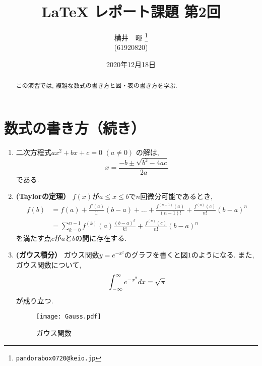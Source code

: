 \documentclass[a4paper,12pt]{jarticle}
\begin{document}
\title{LaTeX レポート課題 第2回}
\author{横井　暉 \thanks{\texttt{pandorabox0720@keio.jp}}\\
(61920820)}
\date{2020年12月18日}
%
\maketitle

\begin{abstract}

この演習では, 複雑な数式の書き方と図・表の書き方を学ぶ.

\end{abstract}

\section{数式の書き方（続き）}

\begin{enumerate}

\item 二次方程式$ax^2 + bx + c = 0$ $(a \neq 0)$ の解は,
\[ x = \frac{ -b \pm \sqrt{b^2 - 4ac}}{2a} \]
である.

\item \textbf{(Taylorの定理）}
$f (x)$が$a \leq x \leq b$で$n$回微分可能であるとき,\\
\begin{align*}
f(b) &=  f(a) + \frac{f'(a)}{1!}(b - a) + \ldots + \frac{f^{(n-1)}(a)}{(n-1)!} + \frac{f^{(n)}(c)}{n!}(b-a)^n\\
     &= \sum_{k = 0}^{n - 1} f^{(k)}(a) \frac{(b-a)^k}{k!} + \frac{f^{(n)}(c)}{n!} (b-a)^n
\end{align*} 
を満たす点$c$が$a$と$b$の間に存在する.
\item \textbf{(ガウス積分）}
ガウス関数$y = e^{-x^2}$のグラフを書くと図$1$のようになる. また, ガウス関数について,
\[ \int_{-\infty}^{\infty} e^{-x^2} dx = \sqrt{\pi\\} \]
が成り立つ.
\begin{figure}[h] \centering
\texttt{[image: Gauss.pdf]}
\caption{ガウス関数}\label{figure1}
\end{figure}
\end{enumerate}
\end{document}
